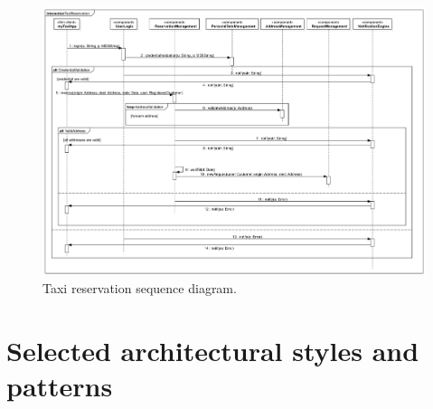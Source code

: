 \begin{figure}%
	\centering%
	\includegraphics[width=\textwidth]{img/Sequence__Collaboration2__Interaction1__TaxiReservation_3}%
	\caption{Taxi reservation sequence diagram.}\label{fig:resSequence}%
\end{figure}
























\clearpage%
\section{Selected architectural styles and patterns}\label{sec:styles}


%
%
%
%
%




